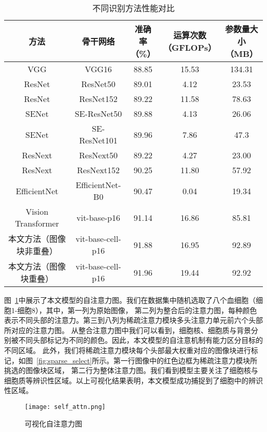 \begin{table}[htbp]
  \caption{不同识别方法性能对比}   
  \centering 
  \label{table:cell_con}
  \begin{tabular}{ccccc}
    \toprule[2pt]
    方法 & 骨干网络  &  \makecell{准确率 \\（\%）} & \makecell{运算次数 \\（GFLOPs）} & \makecell{参数量大小\\（MB）} \\
    \midrule[1.5pt] 
    VGG                & VGG16             & 88.85 & 15.53 & 134.31 \\
    ResNet             & ResNet50          & 89.01 & 4.12  & 23.53  \\
    ResNet             & ResNet152         & 89.22 & 11.58 & 78.63  \\
    SENet              & SE-ResNet50       & 89.88 & 4.13  & 26.06  \\
    SENet              & SE-ResNet101      & 89.96 & 7.86  & 47.3   \\
    ResNext            & ResNext50         & 89.22 & 4.27  & 23.00  \\
    ResNext            & ResNext152        & 90.25 & 11.80 & 57.92  \\
    EfficientNet       & EfficientNet-B0   & 90.47 & 0.04  & 19.34  \\
    \hline
    Vision Transformer & vit-base-p16      & 91.14 & 16.86 & 85.81  \\
    本文方法（图像块非重叠）       & vit-base-cell-p16 & 91.88 & 16.95 & 92.89  \\
    本文方法（图像块重叠）        & vit-base-cell-p16 & 91.96 & 19.44 & 92.92\\ 
    \bottomrule[2pt]      
  \end{tabular} 
\end{table}

图~\ref{fig:self_attn}中展示了本文模型的自注意力图。我们在数据集中随机选取了八个血细胞（细胞1-细胞8），其中，第一列为原始图像，
第二列为整合后的注意力图，每种颜色表示不同头部的注意力。第三到八列为稀疏注意力模块多头注意力单元前六个头部所对应的注意力图。
从整合注意力图中我们可以看到，细胞核、细胞质与背景分别被不同头部标记为不同的颜色。因此，本文模型的自注意机制有能力区分目标的不同区域。
此外，我们将稀疏注意力模块每个头部最大权重对应的图像块进行标记，如图~\ref{fig:sparse_select}所示。第一行图像中的红色边框为稀疏注意力模块所挑选的图像块区域，
第二行为整体注意力图。我们看到模型主要关注了细胞核与细胞质等辨识性区域。以上可视化结果表明，本文模型成功捕捉到了细胞中的辨识性区域。
\begin{figure}[htbp] 
  \centering   
  \texttt{[image: self\_attn.png]}   
  \caption{可视化自注意力图}   
  \label{fig:self_attn} 
\end{figure}  

